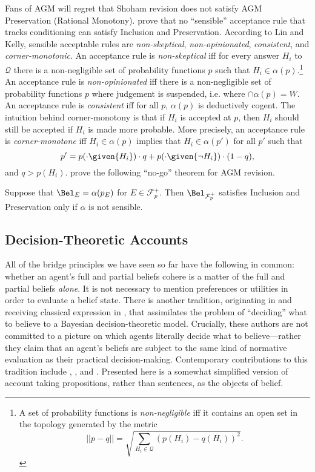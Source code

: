 Fans of AGM will regret that Shoham revision does not satisfy AGM Preservation
(Rational Monotony). \citet{lin2012propositional} prove that no ``sensible''
acceptance rule that tracks conditioning can satisfy Inclusion and
Preservation. According to Lin and Kelly, sensible acceptable rules are {\em
non-skeptical}, {\em non-opinionated}, {\em consistent}, and {\em
corner-monotonic}. An acceptance rule  is {\em non-skeptical} iff for every
answer $H_i$ to $\mathcal{Q}$ there is a non-negligible set of probability
functions $p$ such that $H_i\in \alpha(p)$.\footnote{A set of probability
functions is {\em non-negligible} iff it contains an open set in the topology
generated by the metric $$\lvert\lvert p -q \rvert\rvert = \sqrt{\sum_{H_i \in
\mathcal{Q}} (p(H_i) - q(H_i))^2}.$$ } An acceptance rule is {\em
non-opinionated} iff there is a non-negligible set of probability functions $p$
where judgement is suspended, i.e. where $\cap \alpha(p)=W$. An acceptance rule
is {\em consistent} iff for all $p$, $\alpha(p)$ is deductively cogent.  The
intuition behind corner-monotony is that if $H_i$ is accepted at $p$, then $H_i$
should still be accepted if $H_i$ is made more probable. More precisely, an
acceptance rule is {\em corner-monotone} iff  $H_i\in\alpha(p)$ implies that
$H_i \in \alpha(p')$ for all $p'$ such that $$p' = p(\cdot \given  {H_i}) \cdot
q +  p(\cdot \given {\neg H_i}) \cdot (1-q), $$ and $q>p(H_i)$.
\citet{lin2012propositional} prove the following ``no-go'' theorem for AGM
revision.

\begin{theorem}
  Suppose that $\Bel_E = \alpha(p_E)$ for $E\in\mathcal{F}_p^+$. Then
  $\Bel_{\mathcal{F}_p^+}$ satisfies Inclusion and Preservation only if $\alpha$
  is not sensible. 
\end{theorem}



\subsection{Decision-Theoretic Accounts}

All of the bridge principles we have seen so far have the following in common:
whether an agent's full and partial beliefs cohere is a matter of the full and
partial beliefs {\em alone}. It is not necessary to mention preferences or
utilities in order to evaluate a belief state. There is another tradition,
originating in \citet{hempel1962dednom} and receiving classical expression in
\citet{levi1967gambling}, that assimilates the problem of ``deciding'' what to
believe to a Bayesian decision-theoretic model. Crucially, these authors are not
committed to a picture on which agents literally decide what to believe---rather
they claim that an agent's beliefs are subject to the same kind of normative
evaluation as their practical decision-making. Contemporary contributions to
this tradition include \citet{easwaran2015truthlove},
\citet{pettigrew2016jamesian}, and \citet{dorst2017lockeans}.  Presented here is
a somewhat simplified version of  account taking
propositions, rather than sentences, as the objects of belief.

